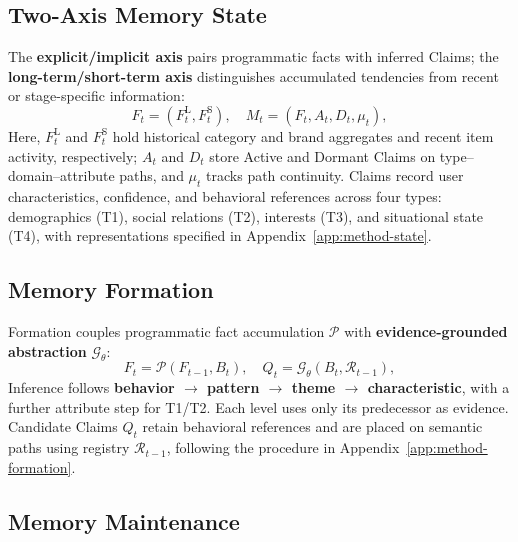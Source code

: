 \documentclass[sigconf,nonacm,balance=false]{acmart}
\begin{document}
\subsection{Two-Axis Memory State}
\label{sec:method-state}

The \textbf{explicit/implicit axis} pairs programmatic facts with inferred Claims; the \textbf{long-term/short-term axis} distinguishes accumulated tendencies from recent or stage-specific information:
\begin{equation}
    F_t=(F_t^{\mathrm{L}},F_t^{\mathrm{S}}),\quad M_t=(F_t,A_t,D_t,\mu_t),
    \label{eq:behaviormem-state}
\end{equation}
Here, $F_t^{\mathrm{L}}$ and $F_t^{\mathrm{S}}$ hold historical category and brand aggregates and recent item activity, respectively; $A_t$ and $D_t$ store Active and Dormant Claims on type--domain--attribute paths, and $\mu_t$ tracks path continuity. Claims record user characteristics, confidence, and behavioral references across four types: demographics (T1), social relations (T2), interests (T3), and situational state (T4), with representations specified in Appendix~\ref{app:method-state}.

\subsection{Memory Formation}
\label{sec:method-evolution}
\label{sec:method-formation}

Formation couples programmatic fact accumulation $\mathcal{P}$ with \textbf{evidence-grounded abstraction} $\mathcal{G}_{\theta}$:
\begin{equation}
    F_t=\mathcal{P}(F_{t-1},B_t),\quad Q_t=\mathcal{G}_{\theta}(B_t,\mathcal{R}_{t-1}),
    \label{eq:behaviormem-formation}
\end{equation}
Inference follows \textbf{behavior $\rightarrow$ pattern $\rightarrow$ theme $\rightarrow$ characteristic}, with a further attribute step for T1/T2. Each level uses only its predecessor as evidence. Candidate Claims $Q_t$ retain behavioral references and are placed on semantic paths using registry $\mathcal{R}_{t-1}$, following the procedure in Appendix~\ref{app:method-formation}.

\subsection{Memory Maintenance}
\label{sec:method-maintenance}
\end{document}
